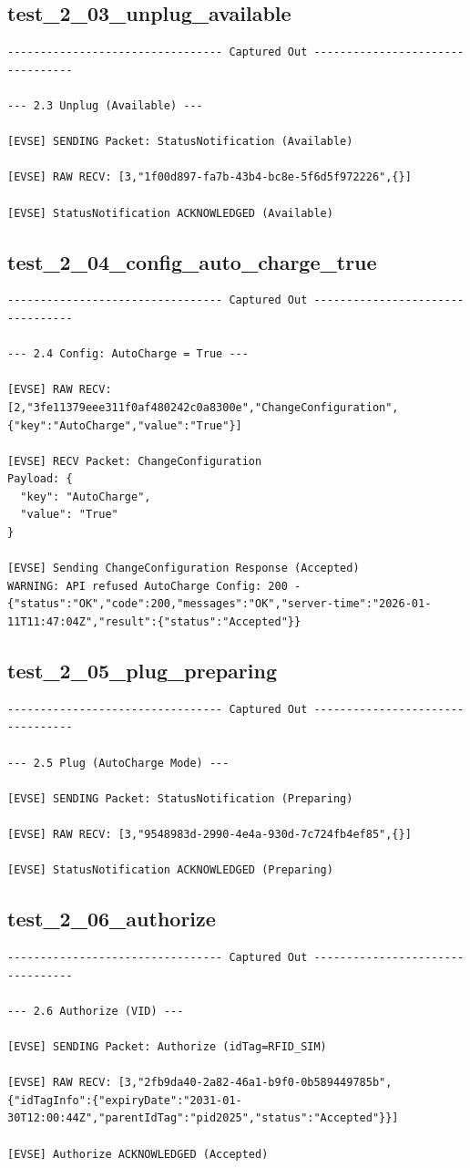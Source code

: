 \documentclass{article}
\begin{document}
\subsection*{test\_2\_03\_unplug\_available}
\begin{lstlisting}
--------------------------------- Captured Out ---------------------------------

--- 2.3 Unplug (Available) ---

[EVSE] SENDING Packet: StatusNotification (Available)

[EVSE] RAW RECV: [3,"1f00d897-fa7b-43b4-bc8e-5f6d5f972226",{}]

[EVSE] StatusNotification ACKNOWLEDGED (Available)
\end{lstlisting}
\subsection*{test\_2\_04\_config\_auto\_charge\_true}
\begin{lstlisting}
--------------------------------- Captured Out ---------------------------------

--- 2.4 Config: AutoCharge = True ---

[EVSE] RAW RECV: [2,"3fe11379eee311f0af480242c0a8300e","ChangeConfiguration",{"key":"AutoCharge","value":"True"}]

[EVSE] RECV Packet: ChangeConfiguration
Payload: {
  "key": "AutoCharge",
  "value": "True"
}

[EVSE] Sending ChangeConfiguration Response (Accepted)
WARNING: API refused AutoCharge Config: 200 - {"status":"OK","code":200,"messages":"OK","server-time":"2026-01-11T11:47:04Z","result":{"status":"Accepted"}}
\end{lstlisting}
\subsection*{test\_2\_05\_plug\_preparing}
\begin{lstlisting}
--------------------------------- Captured Out ---------------------------------

--- 2.5 Plug (AutoCharge Mode) ---

[EVSE] SENDING Packet: StatusNotification (Preparing)

[EVSE] RAW RECV: [3,"9548983d-2990-4e4a-930d-7c724fb4ef85",{}]

[EVSE] StatusNotification ACKNOWLEDGED (Preparing)
\end{lstlisting}
\subsection*{test\_2\_06\_authorize}
\begin{lstlisting}
--------------------------------- Captured Out ---------------------------------

--- 2.6 Authorize (VID) ---

[EVSE] SENDING Packet: Authorize (idTag=RFID_SIM)

[EVSE] RAW RECV: [3,"2fb9da40-2a82-46a1-b9f0-0b589449785b",{"idTagInfo":{"expiryDate":"2031-01-30T12:00:44Z","parentIdTag":"pid2025","status":"Accepted"}}]

[EVSE] Authorize ACKNOWLEDGED (Accepted)
\end{lstlisting}
\end{document}
